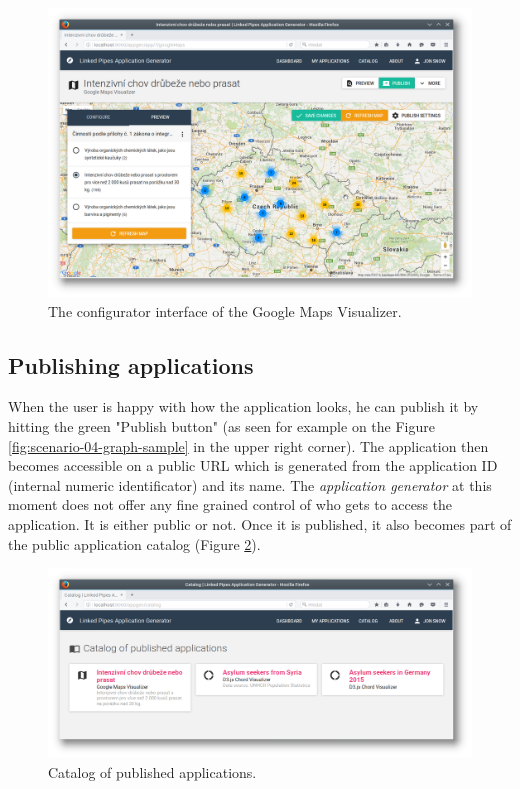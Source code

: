 \begin{figure}
	\centering
	\includegraphics[width=145mm]{img/05_google_maps_visualizer.png}
	\caption{The configurator interface of the Google Maps Visualizer.}
    \label{fig:google_maps_visualizer}
\end{figure}

\subsection{Publishing applications}

When the user is happy with how the application looks, he can publish it by hitting the green "Publish button" (as seen for example on the Figure \ref{fig:scenario-04-graph-sample} in the upper right corner). The application then becomes accessible on a public URL which is generated from the application ID (internal numeric identificator) and its name. The \emph{application generator} at this moment does not offer any fine grained control of who gets to access the application. It is either public or not. Once it is published, it also becomes part of the public application catalog (Figure \ref{fig:catalog}).

\begin{figure}
	\centering
	\includegraphics[width=145mm]{img/05_catalog}
	\caption{Catalog of published applications.}
    \label{fig:catalog}
\end{figure}

